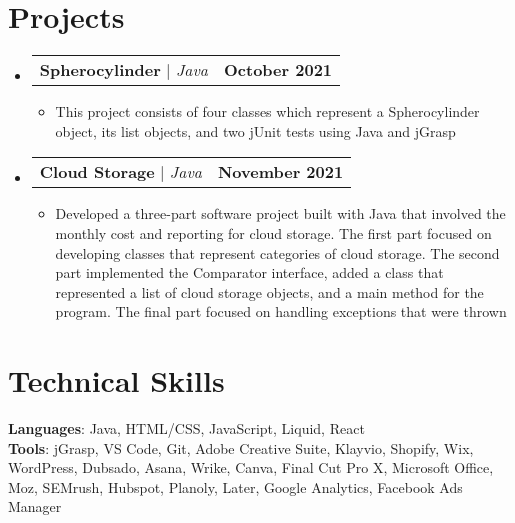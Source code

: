 \documentclass[letterpaper,11pt]{article}
\makeatletter
\newcommand{\resumeItem}[1]{
  \item\small{
    {#1 \vspace{-2pt}}
  }
}
\newcommand{\resumeProjectHeading}[2]{
    \item
    \begin{tabular*}{1.001\textwidth}{l@{\extracolsep{\fill}}r}
     \small#1 & \textbf{\small #2}\\
    \end{tabular*}\vspace{-7pt}
}
\newcommand{\resumeSubHeadingListStart}{\begin{itemize}[leftmargin=0.0in, label={}]}
\newcommand{\resumeSubHeadingListEnd}{\end{itemize}}
\newcommand{\resumeItemListStart}{\begin{itemize}}
\newcommand{\resumeItemListEnd}{\end{itemize}\vspace{-5pt}}
\makeatother
\begin{document}
\section{Projects}
    \vspace{-5pt}
    \resumeSubHeadingListStart
      \resumeProjectHeading
          {\textbf{Spherocylinder} $|$ \emph{Java}}{October 2021}
          \resumeItemListStart
            \resumeItem{This project consists of four classes which represent a Spherocylinder object, its list objects, and two jUnit tests using Java and jGrasp}
          \resumeItemListEnd
          \vspace{-13pt}
      \resumeProjectHeading
          {\textbf{Cloud Storage} $|$ \emph{Java}}{November 2021}
          \resumeItemListStart
            \resumeItem{Developed a three-part software project built with Java that involved the monthly cost and reporting for cloud storage. The first part focused on developing classes that represent categories of cloud storage. The second part implemented the Comparator interface, added a class that represented a list of cloud storage objects, and a main method for the program. The final part focused on handling exceptions that were thrown}
          \resumeItemListEnd 
          \vspace{-13pt}
          
    \resumeSubHeadingListEnd
\vspace{-5pt}


%
\section{Technical Skills}
 \begin{itemize}[leftmargin=0.15in, label={}]
    \small{\item{
     \textbf{Languages}{: Java, HTML/CSS, JavaScript, Liquid, React} \\
     \textbf{Tools}{: jGrasp, VS Code, Git, Adobe Creative Suite, Klayvio, Shopify, Wix, WordPress, Dubsado, Asana, Wrike, Canva, Final Cut Pro X, Microsoft Office, Moz, SEMrush, Hubspot, Planoly, Later, Google Analytics, Facebook Ads Manager} \\
    }}
 \end{itemize}
 \vspace{-16pt}
\end{document}
